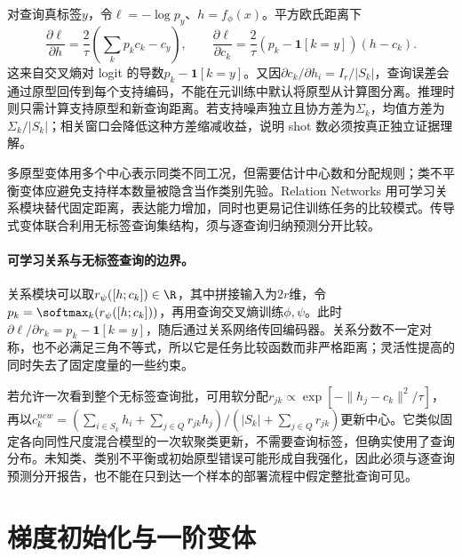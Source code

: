 对查询真标签$y$，令$\ell=-\log p_y$、$h=f_\phi(x)$。平方欧氏距离下
\begin{equation}
 \frac{\partial\ell}{\partial h}
 =\frac2\tau\left(\sum_kp_kc_k-c_y\right),\qquad
 \frac{\partial\ell}{\partial c_k}
 =\frac2\tau(p_k-\mathbf1[k=y])(h-c_k).
\end{equation}
这来自交叉熵对 logit 的导数$p_k-\mathbf1[k=y]$。又因$\partial c_k/\partial h_i=I_r/|S_k|$，查询误差会通过原型回传到每个支持编码，不能在元训练中默认将原型从计算图分离。推理时则只需计算支持原型和新查询距离。若支持噪声独立且协方差为$\Sigma_k$，均值方差为$\Sigma_k/|S_k|$；相关窗口会降低这种方差缩减收益，说明 shot 数必须按真正独立证据理解。

多原型变体用多个中心表示同类不同工况，但需要估计中心数和分配规则；类不平衡变体应避免支持样本数量被隐含当作类别先验。Relation Networks 用可学习关系模块替代固定距离\cite{sung2018relation}，表达能力增加，同时也更易记住训练任务的比较模式。传导式变体联合利用无标签查询集结构，须与逐查询归纳预测分开比较。

\paragraph{可学习关系与无标签查询的边界。}
关系模块可以取$r_\psi([h;c_k])\in\R$，其中拼接输入为$2r$维，令$p_k=\softmax_k(r_\psi([h;c_k]))$，再用查询交叉熵训练$\phi,\psi$。此时$\partial\ell/\partial r_k=p_k-\mathbf1[k=y]$，随后通过关系网络传回编码器。关系分数不一定对称，也不必满足三角不等式，所以它是任务比较函数而非严格距离；灵活性提高的同时失去了固定度量的一些约束。

若允许一次看到整个无标签查询批，可用软分配$r_{jk}\propto\exp[-\|h_j-c_k\|^2/\tau]$，再以$c_k^{new}=(\sum_{i\in S_k}h_i+\sum_{j\in Q}r_{jk}h_j)/(|S_k|+\sum_{j\in Q}r_{jk})$更新中心。它类似固定各向同性尺度混合模型的一次软聚类更新，不需要查询标签，但确实使用了查询分布。未知类、类别不平衡或初始原型错误可能形成自我强化，因此必须与逐查询预测分开报告，也不能在只到达一个样本的部署流程中假定整批查询可见。

\section{梯度初始化与一阶变体}
